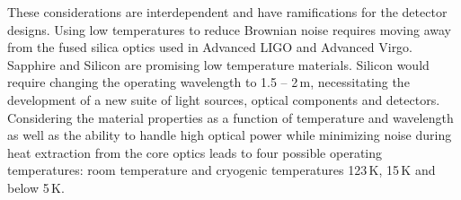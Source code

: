 These considerations are interdependent and have ramifications for the detector designs. Using low temperatures to reduce Brownian noise requires moving away from the fused silica optics used in Advanced LIGO and Advanced Virgo. Sapphire and Silicon are promising low temperature materials. Silicon would require changing the operating wavelength to 1.5 -- 2\,\micro m, necessitating the development of a new suite of light sources, optical components and detectors. Considering the material properties as a function of temperature and wavelength as well as the ability to handle high optical power while minimizing noise during heat extraction from the core optics leads to four possible operating temperatures:
room temperature and cryogenic temperatures 123\,K, 15\,K and below 5\,K.


